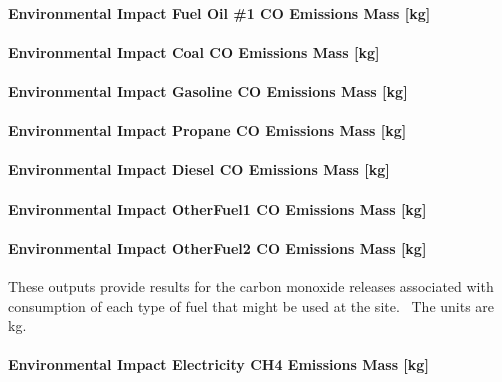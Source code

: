 \paragraph{Environmental Impact Fuel Oil \#1 CO Emissions Mass {[}kg{]}}\label{environmental-impact-fuel-oil-1-co-emissions-mass-kg}

\paragraph{Environmental Impact Coal CO Emissions Mass {[}kg{]}}\label{environmental-impact-coal-co-emissions-mass-kg}

\paragraph{Environmental Impact Gasoline CO Emissions Mass {[}kg{]}}\label{environmental-impact-gasoline-co-emissions-mass-kg}

\paragraph{Environmental Impact Propane CO Emissions Mass {[}kg{]}}\label{environmental-impact-propane-co-emissions-mass-kg}

\paragraph{Environmental Impact Diesel CO Emissions Mass {[}kg{]}}\label{environmental-impact-diesel-co-emissions-mass-kg}

\paragraph{Environmental Impact OtherFuel1 CO Emissions Mass {[}kg{]}}\label{environmental-impact-otherfuel1-co-emissions-mass-kg}

\paragraph{Environmental Impact OtherFuel2 CO Emissions Mass {[}kg{]}}\label{environmental-impact-otherfuel2-co-emissions-mass-kg}

These outputs provide results for the carbon monoxide releases associated with consumption of each type of fuel that might be used at the site.~ The units are kg.

\paragraph{Environmental Impact Electricity CH4 Emissions Mass {[}kg{]}}\label{environmental-impact-electricity-ch4-emissions-mass-kg}


